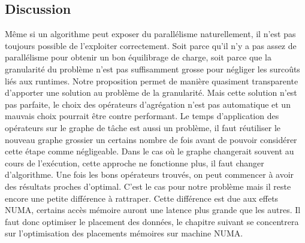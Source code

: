 \subsection{Discussion}
Même si un algorithme peut exposer du parallélisme naturellement, il n'est pas toujours possible de l'exploiter correctement.
%
Soit parce qu'il n'y a pas assez de parallélisme pour obtenir un bon équilibrage de charge, soit parce que la granularité du problème n'est pas suffisamment grosse pour négliger les surcoûts liés aux runtimes.
%
Notre proposition permet de manière quasiment transparente d'apporter une solution au problème de la granularité.
%
Mais cette solution n'est pas parfaite, le choix des opérateurs d'agrégation n'est pas automatique et un mauvais choix pourrait être contre performant.
%
Le temps d'application des opérateurs sur le graphe de tâche est aussi un problème, il faut réutiliser le nouveau graphe grossier un certains nombre de fois avant de pouvoir considérer cette étape comme négligeable.
%
Dans le cas où le graphe changerait souvent au cours de l'exécution, cette approche ne fonctionne plus, il faut changer d'algorithme.
%
Une fois les bons opérateurs trouvés, on peut commencer à avoir des résultats proches d'optimal.
%
C'est le cas pour notre problème mais il reste encore une petite différence à rattraper.
%
Cette différence est due aux effets NUMA, certains accès mémoire auront une latence plus grande que les autres.
%
Il faut donc optimiser le placement des données, le chapitre suivant se concentrera sur l'optimisation des placements mémoires sur machine NUMA.
